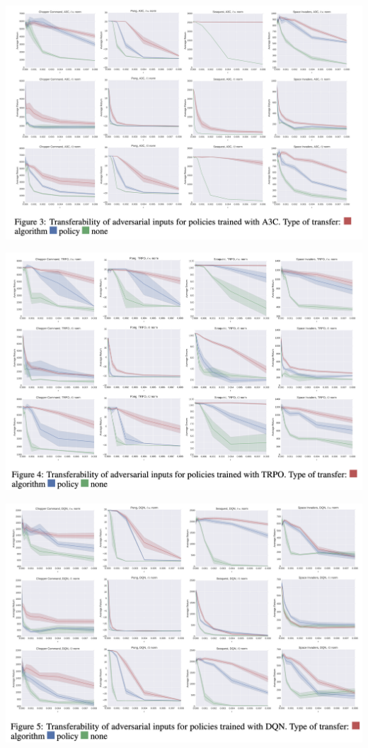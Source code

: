 \documentclass{beamer}
\begin{document}
\begin{frame}
\includegraphics[width =1\columnwidth]{fig3-trans-A3C.png}
\end{frame}

\begin{frame}
\includegraphics[width =1\columnwidth]{fig4-trans-TRPO.png}
\end{frame}

\begin{frame}
\includegraphics[width =1\columnwidth]{fig5-trans-DQN.png}
\end{frame}
\end{document}
